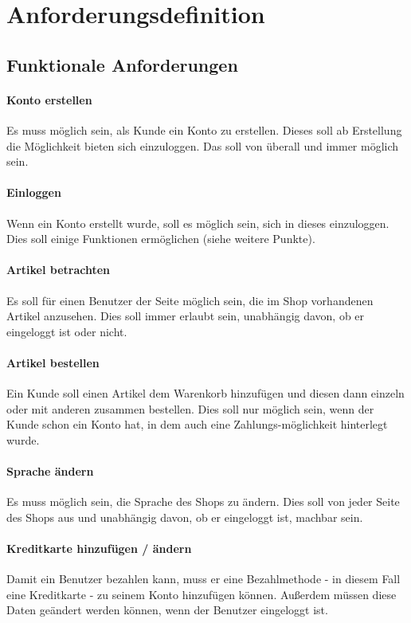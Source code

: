 \documentclass[a4paper]{article}
\begin{document}
\section{Anforderungsdefinition}
\subsection{Funktionale Anforderungen}
\paragraph{Konto erstellen}
Es muss möglich sein, als Kunde ein Konto zu erstellen. Dieses soll ab Erstellung die Möglichkeit bieten sich einzuloggen. Das soll von überall und immer möglich sein.
\paragraph{Einloggen}
Wenn ein Konto erstellt wurde, soll es möglich sein, sich in dieses einzuloggen. Dies soll einige Funktionen ermöglichen (siehe weitere Punkte).
\paragraph{Artikel betrachten}
Es soll für einen Benutzer der Seite möglich sein, die im Shop vorhandenen Artikel anzusehen. Dies soll immer erlaubt sein, unabhängig davon, ob er eingeloggt ist oder nicht.
\paragraph{Artikel bestellen}
Ein Kunde soll einen Artikel dem Warenkorb hinzufügen und diesen dann einzeln oder mit anderen zusammen bestellen. Dies soll nur möglich sein, wenn der Kunde schon ein Konto hat, in dem auch eine Zahlungs-möglichkeit hinterlegt wurde.
\paragraph{Sprache ändern}
Es muss möglich sein, die Sprache des Shops zu ändern. Dies soll von jeder Seite des Shops aus und unabhängig davon, ob er eingeloggt ist, machbar sein.
\paragraph{Kreditkarte hinzufügen / ändern}
Damit ein Benutzer bezahlen kann, muss er eine Bezahlmethode - in diesem Fall eine Kreditkarte - zu seinem Konto hinzufügen können. Außerdem müssen diese Daten geändert werden können, wenn der Benutzer eingeloggt ist.
\end{document}
